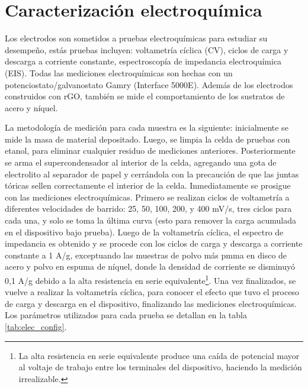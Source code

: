 \section{Caracterización electroquímica}
Los electrodos son sometidos a pruebas electroquímicas para estudiar su desempeño, estás pruebas incluyen: voltametría cíclica (CV), ciclos de carga y descarga a corriente constante, espectroscopía de impedancia electroquímica (EIS). Todas las mediciones electroquímicas son hechas con un potenciostato/galvanostato Gamry (Interface 5000E). Además de los electrodos construidos con rGO, también se mide el comportamiento de los sustratos de acero y níquel.

La metodología de medición para cada muestra es la siguiente: inicialmente se mide la masa de material depositado. Luego, se limpia la celda de pruebas con etanol, para eliminar cualquier residuo de mediciones anteriores. Posteriormente se arma el supercondensador al interior de la celda, agregando una gota de electrolito al separador de papel y cerrándola con la precaución de que las juntas tóricas sellen correctamente el interior de la celda. Inmediatamente se prosigue con las mediciones electroquímicas. Primero se realizan ciclos de voltametría a diferentes velocidades de barrido: 25, 50, 100, 200, y 400 mV/s, tres ciclos para cada una, y solo se toma la última curva (esto para remover la carga acumulada en el dispositivo bajo prueba).  Luego de la voltametría cíclica, el espectro de impedancia es obtenido y se procede con los ciclos de carga y descarga a corriente constante a 1 A/g, exceptuando las muestras de polvo más pmma en disco de acero y polvo en espuma de níquel, donde la densidad de corriente se disminuyó 0,1 A/g debido a la alta resistencia en serie equivalente\footnote{La alta resistencia en serie equivalente produce una caída de potencial mayor al voltaje de trabajo entre los terminales del dispositivo, haciendo la medición irrealizable. }. Una vez finalizados, se vuelve a realizar la voltametría cíclica, para conocer el efecto que tuvo el proceso de carga y descarga en el dispositivo, finalizando las mediciones electroquímicas. Los parámetros utilizados para cada prueba se detallan en la tabla \ref{tab:elec_config}.


